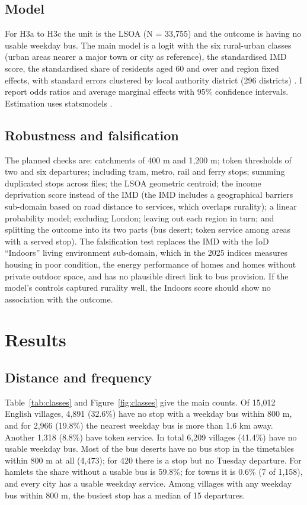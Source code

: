\documentclass[11pt,a4paper]{article}
\begin{document}
\subsection{Model}
For H3a to H3c the unit is the LSOA (N = 33,755) and the outcome is having no usable weekday bus. The main model is a logit with the six rural-urban classes (urban areas nearer a major town or city as reference), the standardised IMD score, the standardised share of residents aged 60 and over and region fixed effects, with standard errors clustered by local authority district (296 districts) \citep{cameron2015}. I report odds ratios and average marginal effects with 95\% confidence intervals. Estimation uses statsmodels \citep{seabold2010}.

\subsection{Robustness and falsification}
The planned checks are: catchments of 400 m and 1,200 m; token thresholds of two and six departures; including tram, metro, rail and ferry stops; summing duplicated stops across files; the LSOA geometric centroid; the income deprivation score instead of the IMD (the IMD includes a geographical barriers sub-domain based on road distance to services, which overlaps rurality); a linear probability model; excluding London; leaving out each region in turn; and splitting the outcome into its two parts (bus desert; token service among areas with a served stop). The falsification test replaces the IMD with the IoD ``Indoors'' living environment sub-domain, which in the 2025 indices measures housing in poor condition, the energy performance of homes and homes without private outdoor space, and has no plausible direct link to bus provision. If the model's controls captured rurality well, the Indoors score should show no association with the outcome.

\section{Results}\label{sec:results}
\subsection{Distance and frequency}
Table~\ref{tab:classes} and Figure~\ref{fig:classes} give the main counts. Of 15,012 English villages, 4,891 (32.6\%) have no stop with a weekday bus within 800 m, and for 2,966 (19.8\%) the nearest weekday bus is more than 1.6 km away. Another 1,318 (8.8\%) have token service. In total 6,209 villages (41.4\%) have no usable weekday bus. Most of the bus deserts have no bus stop in the timetables within 800 m at all (4,473); for 420 there is a stop but no Tuesday departure. For hamlets the share without a usable bus is 59.8\%; for towns it is 0.6\% (7 of 1,158), and every city has a usable weekday service. Among villages with any weekday bus within 800 m, the busiest stop has a median of 15 departures.
\end{document}
